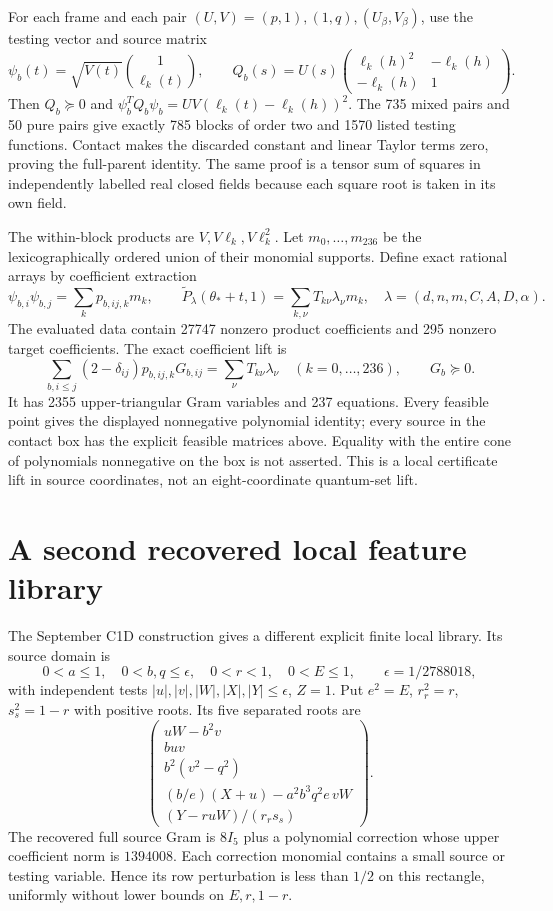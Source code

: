 \documentclass[11pt]{article}
\begin{document}
For each frame and each pair $(U,V)=(p,1),(1,q),(U_\beta,V_\beta)$,
use the testing vector and source matrix
\[
 \psi_b(t)=\sqrt{V(t)}\binom{1}{\ell_k(t)},\qquad
 Q_b(s)=U(s)\begin{pmatrix}\ell_k(h)^2&-\ell_k(h)\\-\ell_k(h)&1\end{pmatrix}.
\]
Then $Q_b\succeq0$ and
$\psi_b^TQ_b\psi_b=UV(\ell_k(t)-\ell_k(h))^2$. The 735 mixed
pairs and 50 pure pairs give exactly 785 blocks of order two and
1570 listed testing functions. Contact makes the discarded constant
and linear Taylor terms zero, proving the full-parent identity.
The same proof is a tensor sum of squares in independently labelled
real closed fields because each square root is taken in its own field.

The within-block products are $V,V\ell_k,V\ell_k^2$. Let
$m_0,\ldots,m_{236}$ be the lexicographically ordered union of their
monomial supports. Define exact rational arrays by coefficient extraction
\[
 \psi_{b,i}\psi_{b,j}=\sum_kp_{b,ij,k}m_k,
 \qquad \widetilde P_{\lambda}(\theta_*+t,1)
             =\sum_{k,\nu}T_{k\nu}\lambda_\nu m_k,
 \quad\lambda=(d,n,m,C,A,D,\alpha).
\]
The evaluated data contain 27747 nonzero product coefficients and
295 nonzero target coefficients. The exact coefficient lift is
\[
 \sum_{b,i\leq j}(2-\delta_{ij})p_{b,ij,k}G_{b,ij}
       =\sum_\nu T_{k\nu}\lambda_\nu\quad(k=0,\ldots,236),
 \qquad G_b\succeq0.
\]
It has 2355 upper-triangular Gram variables and 237 equations.
Every feasible point gives the displayed nonnegative polynomial
identity; every source in the contact box has the explicit feasible
matrices above. Equality with the entire cone of polynomials nonnegative
on the box is not asserted. This is a local certificate lift in source
coordinates, not an eight-coordinate quantum-set lift.

\section{A second recovered local feature library}

The September C1D construction gives a different explicit finite local
library. Its source domain is
\[
 0<a\leq1,\quad0<b,q\leq\epsilon,\quad0<r<1,\quad0<E\leq1,
 \qquad\epsilon=1/2788018,
\]
with independent tests $|u|,|v|,|W|,|X|,|Y|\leq\epsilon$, $Z=1$.
Put $e^2=E$, $r_r^2=r$, $s_s^2=1-r$ with positive roots. Its five
separated roots are
\[
 \begin{pmatrix}
 uW-b^2v\\buv\\b^2(v^2-q^2)\\
 (b/e)(X+u)-a^2b^3q^2e\,vW\\(Y-ruW)/(r_rs_s)
 \end{pmatrix}.
\]
The recovered full source Gram is $8I_5$ plus a polynomial correction
whose upper coefficient norm is $1394008$. Each correction monomial
contains a small source or testing variable. Hence its row perturbation
is less than $1/2$ on this rectangle, uniformly without lower bounds on
$E,r,1-r$.
\end{document}
